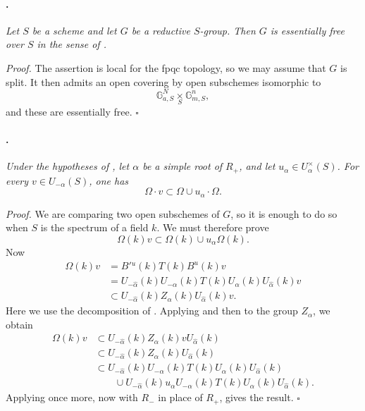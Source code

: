 \paragraph{.}
\textit{Let \(S\) be a scheme and let \(G\) be a reductive
\(S\)-group. Then \(G\) is essentially free over \(S\) in the sense
of .}

\textit{Proof.}
The assertion is local for the fpqc topology, so we may assume that
\(G\) is split. It then admits an open covering by open subschemes
isomorphic to
\[
  \mathbb G_{a,S}^{N}\mathop{\times}\limits_S\mathbb G_{m,S}^{n},
\]
and these are essentially free.
\hfill\(\square\)

\paragraph{.}
\textit{Under the hypotheses of , let \(\alpha\) be a simple
root of \(R_+\), and let \(u_\alpha\in U_\alpha^\times(S)\). For
every \(v\in U_{-\alpha}(S)\), one has}
\[
  \Omega\cdot v\subset\Omega\cup u_\alpha\cdot\Omega.
\]

\textit{Proof.}
We are comparing two open subschemes of \(G\), so it is enough to do
so when \(S\) is the spectrum of a field \(k\). We must therefore
prove
\[
  \Omega(k)v\subset\Omega(k)\cup u_\alpha\Omega(k).
\]
Now
\[
\begin{aligned}
  \Omega(k)v
  &=B'{}^u(k)T(k)B^u(k)v\\
  &=U_{-\widehat\alpha}(k)U_{-\alpha}(k)T(k)
    U_\alpha(k)U_{\widehat\alpha}(k)v\\
  &\subset
    U_{-\widehat\alpha}(k)Z_\alpha(k)
    U_{\widehat\alpha}(k)v.
\end{aligned}
\]
Here we use the decomposition of . Applying 
\textup{} and then  to the group \(Z_\alpha\), we obtain
\[
\begin{aligned}
  \Omega(k)v
  &\subset
    U_{-\widehat\alpha}(k)Z_\alpha(k)v
    U_{\widehat\alpha}(k)\\
  &\subset
    U_{-\widehat\alpha}(k)Z_\alpha(k)
    U_{\widehat\alpha}(k)\\
  &\subset
    U_{-\widehat\alpha}(k)U_{-\alpha}(k)T(k)
    U_\alpha(k)U_{\widehat\alpha}(k)\\
  &\qquad\cup
    U_{-\widehat\alpha}(k)u_\alpha U_{-\alpha}(k)T(k)
    U_\alpha(k)U_{\widehat\alpha}(k).
\end{aligned}
\]
Applying  \textup{} once more, now with \(R_-\) in place
of \(R_+\), gives the result.
\hfill\(\square\)

